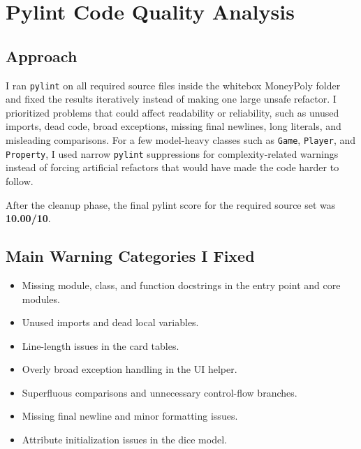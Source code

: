 \documentclass[12pt]{article}
\begin{document}
\section{Pylint Code Quality Analysis}
\subsection{Approach}
I ran \texttt{pylint} on all required source files inside the whitebox MoneyPoly folder and fixed the results iteratively instead of making one large unsafe refactor. I prioritized problems that could affect readability or reliability, such as unused imports, dead code, broad exceptions, missing final newlines, long literals, and misleading comparisons. For a few model-heavy classes such as \texttt{Game}, \texttt{Player}, and \texttt{Property}, I used narrow \texttt{pylint} suppressions for complexity-related warnings instead of forcing artificial refactors that would have made the code harder to follow.

After the cleanup phase, the final pylint score for the required source set was \textbf{10.00/10}.

\subsection{Main Warning Categories I Fixed}
\begin{itemize}
  \item Missing module, class, and function docstrings in the entry point and core modules.
  \item Unused imports and dead local variables.
  \item Line-length issues in the card tables.
  \item Overly broad exception handling in the UI helper.
  \item Superfluous comparisons and unnecessary control-flow branches.
  \item Missing final newline and minor formatting issues.
  \item Attribute initialization issues in the dice model.
\end{itemize}
\end{document}

